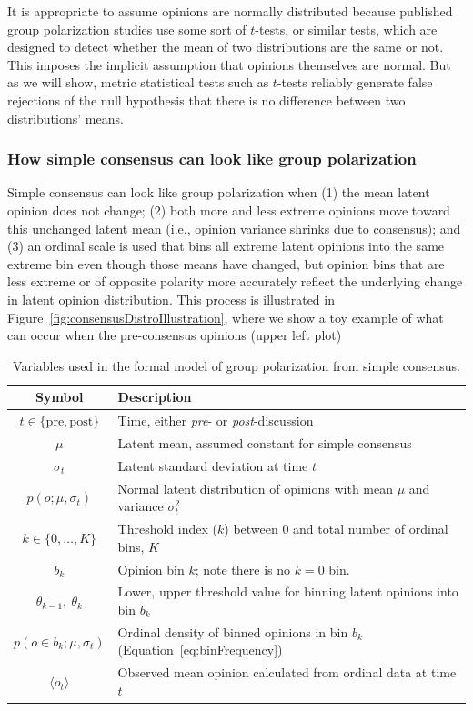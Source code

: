 \documentclass[11pt, letterpaper]{article}
\begin{document}
It is appropriate to assume opinions are normally distributed because published
group polarization studies use some sort of $t$-tests, or similar tests, which are designed
to detect whether the mean of two distributions are the same or not. This imposes the
implicit assumption that opinions themselves are normal. But as we will show, 
metric statistical tests such as $t$-tests reliably generate false rejections
of the null hypothesis that there is no difference between two distributions' means.

\subsubsection{How simple consensus can look like group polarization}

Simple consensus can look like group polarization when (1) the mean latent opinion
does not change; (2) both more and less extreme opinions move toward this 
unchanged latent mean (i.e., opinion variance shrinks due to consensus); 
and (3) an ordinal scale is used that bins all extreme
latent opinions into the same extreme bin even though those means have changed,
but opinion bins that are less extreme or of opposite polarity more accurately
reflect the underlying change in latent opinion distribution. This process is
illustrated in Figure~\ref{fig:consensusDistroIllustration}, where we show
a toy example of what can occur when the pre-consensus
opinions (upper left plot) 

\begin{table}[h]
  \caption{Variables used in the formal model of group polarization from simple consensus.}
  \label{tab:modelVariables}
  \begin{tabular}{cp{5.0in}} \toprule
   Symbol & Description  \\ \midrule  
   $t \in \{\mathrm{pre}, \mathrm{post}\}$ & Time, either \emph{pre}- or
                                           \emph{post}-discussion \\
   $\mu$  &   Latent mean, assumed constant for simple consensus \\ 
   $\sigma_t$ & Latent standard deviation at time $t$ \\
   $p(o;\mu,\sigma_t)$ & Normal latent distribution of opinions with mean
                         $\mu$ and variance $\sigma_t^2$ \\
   $k \in \{0,\ldots,K\} $ & Threshold index ($k$) between 0 and total number of
         ordinal bins, $K$ \\
   $b_k$ & Opinion bin $k$; note there is no $k=0$ bin. \\
   $\theta_{k-1},~\theta_k$  & Lower, upper threshold value for binning latent opinions into
     bin $b_k$ \\
   $p(o \in b_k; \mu, \sigma_t)$ & Ordinal density of binned opinions in bin $b_k$ 
            (Equation~\ref{eq:binFrequency}) \\
   $\langle o_t \rangle$  &   Observed mean opinion calculated from ordinal data at time $t$ \\
   \bottomrule
  \end{tabular} 
\end{table}
\end{document}
